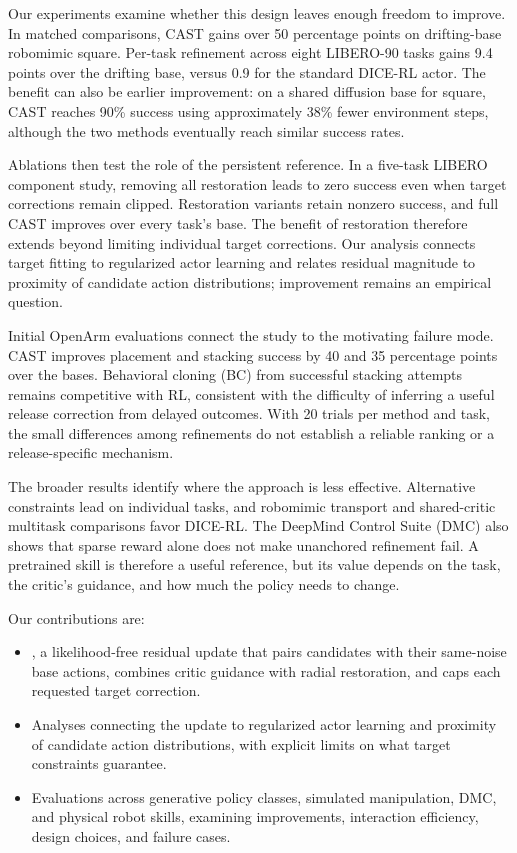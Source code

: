 Our experiments examine whether this design leaves enough freedom to
improve. In matched comparisons, CAST gains over 50 percentage points
on drifting-base robomimic square. Per-task refinement across eight
LIBERO-90 tasks gains 9.4 points over the drifting base, versus 0.9 for
the standard DICE-RL actor. The benefit can also be earlier improvement:
on a shared diffusion base for square, CAST reaches 90\% success using
approximately 38\% fewer environment steps, although the two methods
eventually reach similar success rates.

Ablations then test the role of the persistent reference. In a five-task
LIBERO component study, removing all restoration leads to zero success
even when target corrections remain clipped. Restoration variants retain
nonzero success, and full CAST improves over every task's base. The benefit of restoration therefore extends beyond limiting
individual target corrections. Our analysis connects target fitting to
regularized actor learning and relates residual magnitude to proximity
of candidate action distributions; improvement remains an empirical question.

Initial OpenArm evaluations connect the study to the motivating failure
mode. CAST improves placement and stacking success by 40 and 35 percentage
points over the bases. Behavioral cloning (BC) from successful stacking
attempts remains competitive with RL, consistent with the difficulty of
inferring a useful release correction from delayed outcomes. With 20 trials
per method and task, the small differences among refinements do not
establish a reliable ranking or a release-specific mechanism.

The broader results identify where the approach is less effective.
Alternative constraints lead on individual tasks, and robomimic transport
and shared-critic multitask comparisons favor DICE-RL. The DeepMind Control
Suite (DMC) also shows that sparse reward alone does not make unanchored
refinement fail. A pretrained skill is therefore a useful reference, but
its value depends on the task, the critic's guidance, and how much the
policy needs to change.

Our contributions are:
\begin{itemize}
  \item \method{}, a likelihood-free residual update that pairs candidates
  with their same-noise base actions, combines critic guidance with radial
  restoration, and caps each requested target correction.
  \item Analyses connecting the update to regularized actor learning and
  proximity of candidate action distributions, with explicit limits on
  what target constraints guarantee.
  \item Evaluations across generative policy classes, simulated manipulation,
  DMC, and physical robot skills, examining improvements, interaction
  efficiency, design choices, and failure cases.
\end{itemize}
